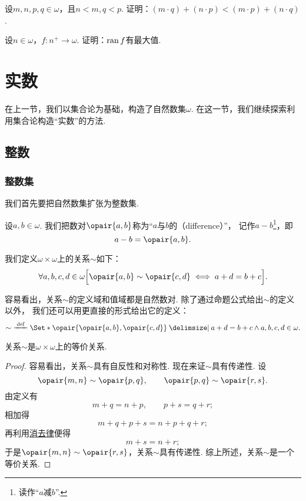 \begin{example}
设\(m,n,p,q\in\omega\)，且\(n<m,q<p\).
证明：\((m \cdot q)+(n \cdot p)<(m \cdot p)+(n \cdot q)\).
\end{example}

\begin{example}
设\(n\in\omega\)，\(f\colon n^+\to\omega\).
证明：\(\operatorname{ran} f\)有最大值.
\end{example}

\section{实数}
在上一节，我们以集合论为基础，构造了自然数集\(\omega\).
在这一节，我们继续探索利用集合论构造“实数”的方法.

\subsection{整数}
\subsubsection{整数集}
我们首先要把自然数集扩张为整数集.

设\(a,b\in\omega\).
我们把数对\(\opair{a,b}\)称为“\(a\)与\(b\)的（difference）”，
记作\(a-b\)\footnote{读作“\(a\)减\(b\)”.}，即\[
	a-b = \opair{a,b}.
\]

\begin{definition}\label{definition:集合论.自然数的差的等价关系}
我们定义\(\omega\times\omega\)上的关系\(\sim\)如下：
\[
	\forall a,b,c,d \in \omega \Bigl[
		\opair{a,b} \sim \opair{c,d}
		\iff
		a+d=b+c
	\Bigr].
\]
\end{definition}

容易看出，关系\(\sim\)的定义域和值域都是自然数对.
除了通过命题公式给出\(\sim\)的定义以外，
我们还可以用更直接的形式给出它的定义：
\[
	\sim\ \defeq \Set*{
		\opair{\opair{a,b},\opair{c,d}}
		\given
		a+d=b+c \land a,b,c,d\in\omega
	}.
\]

\begin{theorem}
关系\(\sim\)是\(\omega\times\omega\)上的等价关系.
\begin{proof}
容易看出，关系\(\sim\)具有自反性和对称性.
现在来证\(\sim\)具有传递性.
设\[
	\opair{m,n}\sim\opair{p,q}, \qquad
	\opair{p,q}\sim\opair{r,s}.
\]
由定义有\[
	m+q=n+p, \qquad
	p+s=q+r;
\]
相加得\[
	m+q+p+s=n+p+q+r;
\]
再利用\hyperref[theorem:集合论.自然数的消去律]{消去律}便得\[
	m+s=n+r;
\]
于是\(\opair{m,n}\sim\opair{r,s}\)，关系\(\sim\)具有传递性.
综上所述，关系\(\sim\)是一个等价关系.
\end{proof}
\end{theorem}

